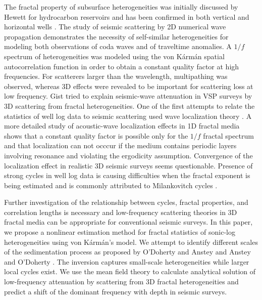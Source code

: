 The fractal property of subsurface heterogeneities was initially discussed by Hewett  
for hydrocarbon reservoirs and has been confirmed in both vertical and horizontal wells \cite[]{Stefani_G01}.
The study of seismic scattering by 2D numerical wave propagation \cite[]{Frankel_C86} 
demonstrates the necessity of self-similar heterogeneities for modeling
both observations of coda waves and of traveltime anomalies.
A $1/f$ spectrum of heterogeneities was modeled 
using the von K\'arm\'an spatial autocorrelation function \cite[]{Vonkarman_48}
in order to obtain a constant quality factor at high frequencies.
For scatterers larger than the wavelength, multipathing was observed, whereas
3D effects were revealed to be important for scattering loss at low frequency.
Gist  tried to explain seismic-wave attenuation in VSP surveys 
by 3D scattering from fractal heterogeneities.
One of the first attempts to relate the statistics of well log data 
to seismic scattering used wave localization theory \cite[]{White_SN90}.
A more detailed study of acoustic-wave localization effects in 1D fractal media \cite[]{Vanderbaan_01}
shows that a constant quality factor is possible only for the $1/f$ fractal spectrum
and that localization can not occcur if the medium contains periodic layers involving resonance
and violating the ergodicity assumption.
Convergence of the localization effect in realistic 3D seismic surveys seems questionable.
Presence of strong cycles in well log data is causing difficulties 
when the fractal exponent is being estimated \cite[]{Dolan_BR98}
and is commonly attributed to Milankovitch cycles \cite[]{Anstey_D02a}.

Further investigation of the relationship between cycles, fractal properties,
and correlation lengths is necessary and low-frequency 
scattering theories in 3D fractal media can be appropriate 
for conventional seismic surveys.
In this paper, we propose a nonlinear estimation method for fractal statistics 
of sonic-log heterogeneities using von K\'arm\'an's model.
We attempt to identify different scales of the sedimentation process
as proposed by O'Doherty and Anstey  and Anstey and O'Doherty .
The inversion captures small-scale heterogeneities while larger local cycles exist.
We use the mean field theory to calculate analytical solution of low-frequency 
attenuation by scattering from 3D fractal heterogeneities
and predict a shift of the dominant frequency with depth in seismic surveys.

